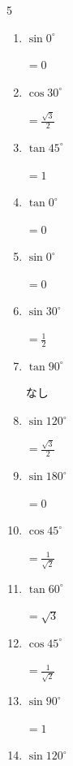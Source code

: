 \begin{multicols}{5}
\begin{enumerate}
  \item $\displaystyle \sin{0^\circ}$

        $\displaystyle =0$

  \item $\displaystyle \cos{30^\circ}$

        $\displaystyle =\frac{\sqrt{3}}{2}$

  \item $\displaystyle \tan{45^\circ}$

        $\displaystyle =1$

  \item $\displaystyle \tan{0^\circ}$

        $\displaystyle =0$

  \item $\displaystyle \sin{0^\circ}$

        $\displaystyle =0$

  \item $\displaystyle \sin{30^\circ}$

        $\displaystyle =\frac{1}{2}$

  \item $\displaystyle \tan{90^\circ}$

        $\displaystyle なし$

  \item $\displaystyle \sin{120^\circ}$

        $\displaystyle =\frac{\sqrt{3}}{2}$

  \item $\displaystyle \sin{180^\circ}$

        $\displaystyle =0$

  \item $\displaystyle \cos{45^\circ}$

        $\displaystyle =\frac{1}{\sqrt{2}}$

  \item $\displaystyle \tan{60^\circ}$

        $\displaystyle =\sqrt{3}$

  \item $\displaystyle \cos{45^\circ}$

        $\displaystyle =\frac{1}{\sqrt{2}}$

\columnbreak %

  \item $\displaystyle \sin{90^\circ}$

        $\displaystyle =1$

  \item $\displaystyle \sin{120^\circ}$


\end{enumerate}
\end{multicols}
